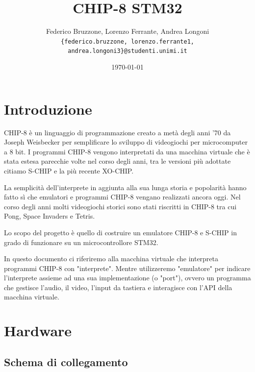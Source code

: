 \documentclass[a4paper]{article}
\title{CHIP-8 STM32}
\date{\today}
\author{Federico Bruzzone, Lorenzo Ferrante, Andrea Longoni \\
\footnotesize \texttt{\{federico.bruzzone, lorenzo.ferrante1, andrea.longoni3\}@studenti.unimi.it} \\ }
\begin{document}
\maketitle

\section{Introduzione}


CHIP-8 è un linguaggio di programmazione creato a metà degli anni '70
da Joseph Weisbecker per semplificare lo sviluppo di videogiochi per
microcomputer a 8 bit. I programmi CHIP-8 vengono interpretati da una
macchina virtuale che è stata estesa parecchie volte nel corso degli
anni, tra le versioni più adottate citiamo S-CHIP e la più recente
XO-CHIP.

La semplicità dell'interprete in aggiunta alla sua lunga storia e
popolarità hanno fatto sì che emulatori e programmi CHIP-8 vengano
realizzati ancora oggi.
Nel corso degli anni molti videogiochi storici sono stati riscritti
in CHIP-8 tra cui Pong, Space Invaders e Tetris.

Lo scopo del progetto è quello di costruire un emulatore CHIP-8 e
S-CHIP in grado di funzionare su un microcontrollore STM32.

In questo documento ci riferiremo alla macchina virtuale che
interpreta programmi CHIP-8 con "interprete". Mentre utilizzeremo
"emulatore" per indicare l'interprete assieme ad una sua
implementazione (o "port"), ovvero un programma che gestisce
l'audio, il video, l'input da tastiera e interagisce con l'API della
macchina virtuale.


\section{Hardware}


\subsection{Schema di collegamento}

\end{document}
